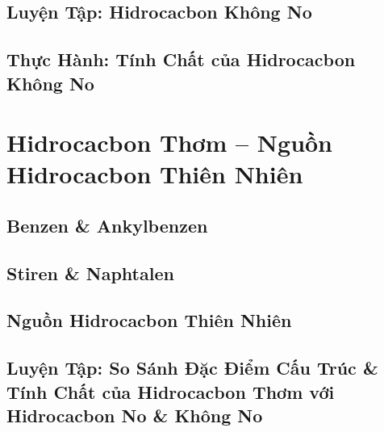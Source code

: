 \documentclass[oneside]{book}
\numberwithin{equation}{section}
\begin{document}

\section{Luyện Tập: Hidrocacbon Không No}


\section{Thực Hành: Tính Chất của Hidrocacbon Không No}


\chapter{Hidrocacbon Thơm -- Nguồn Hidrocacbon Thiên Nhiên}

\section{Benzen \& Ankylbenzen}


\section{Stiren \& Naphtalen}


\section{Nguồn Hidrocacbon Thiên Nhiên}


\section{Luyện Tập: So Sánh Đặc Điểm Cấu Trúc \& Tính Chất của Hidrocacbon Thơm với Hidrocacbon No \& Không No}

\end{document}
